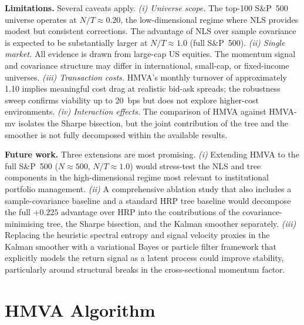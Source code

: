\documentclass[a4paper,12pt]{report}
\begin{document}
\textbf{Limitations.} Several caveats apply.
\textit{(i) Universe scope.} The top-100 S\&P~500 universe operates at
$N/T \approx 0.20$, the low-dimensional regime where NLS provides modest
but consistent corrections. The advantage of NLS over sample covariance is
expected to be substantially larger at $N/T \approx 1.0$ (full S\&P~500).
\textit{(ii) Single market.} All evidence is drawn from large-cap US equities.
The momentum signal and covariance structure may differ in international,
small-cap, or fixed-income universes.
\textit{(iii) Transaction costs.} HMVA's monthly turnover of approximately
1.10 implies meaningful cost drag at realistic bid-ask spreads; the
robustness sweep confirms viability up to 20~bps but does not explore
higher-cost environments.
\textit{(iv) Interaction effects.} The comparison of HMVA against HMVA-mv
isolates the Sharpe bisection, but the joint contribution of the tree
and the smoother is not fully decomposed within the available results.

\textbf{Future work.} Three extensions are most promising.
\textit{(i)} Extending HMVA to the full S\&P~500 ($N \approx 500$,
$N/T \approx 1.0$) would stress-test the NLS and tree components in the
high-dimensional regime most relevant to institutional portfolio management.
\textit{(ii)} A comprehensive ablation study that also includes a
sample-covariance baseline and a standard HRP tree baseline would
decompose the full $+0.225$ advantage over HRP into the contributions
of the covariance-minimising tree, the Sharpe bisection, and the Kalman
smoother separately.
\textit{(iii)} Replacing the heuristic spectral entropy and signal velocity
proxies in the Kalman smoother with a variational Bayes or particle filter
framework that explicitly models the return signal as a latent process
could improve stability, particularly around structural breaks in the
cross-sectional momentum factor.

\appendix

\chapter{HMVA Algorithm}
\label{app:hmva}
\end{document}
